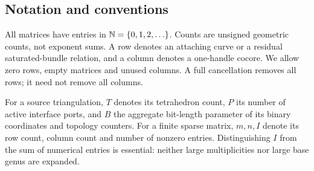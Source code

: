 \subsection{Notation and conventions}

All matrices have entries in $\mathbb N=\{0,1,2,\ldots\}$. Counts are unsigned
geometric counts, not exponent sums. A row denotes an attaching curve
or a residual saturated-bundle relation, and a column denotes a one-handle
cocore. We allow zero rows, empty matrices and unused columns. A full
cancellation removes all rows; it need not remove all columns.

For a source triangulation, $T$ denotes its tetrahedron count, $P$ its
number of active interface ports, and $B$ the aggregate bit-length parameter
of its binary coordinates and topology counters. For a finite sparse
matrix, $m,n,I$ denote its row count, column count and number of nonzero
entries. Distinguishing $I$ from the sum of numerical entries is essential:
neither large multiplicities nor large base genus are expanded.
